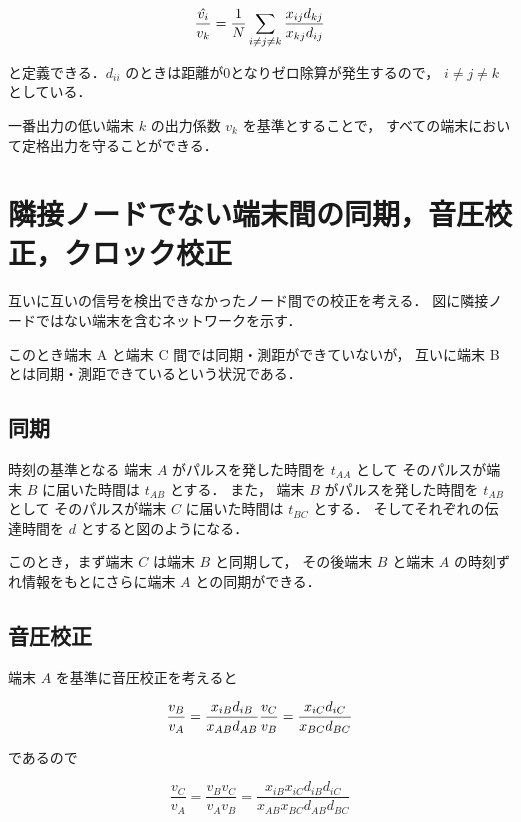 $$
\frac{\hat{v_i}}{v_k} = \frac{1}{N} \sum_{i\neq j \neq k} \frac{x_{ij} d_{kj}}{x_{kj}d_{ij}} \\
$$

と定義できる．$d_{ii}$ のときは距離が0となりゼロ除算が発生するので，
$i\neq j \neq k$ としている．

一番出力の低い端末 $k$ の出力係数 $v_k$ を基準とすることで，
すべての端末において定格出力を守ることができる．

\section{隣接ノードでない端末間の同期，音圧校正，クロック校正}


互いに互いの信号を検出できなかったノード間での校正を考える．
図に隣接ノードではない端末を含むネットワークを示す．


このとき端末 A と端末 C 間では同期・測距ができていないが，
互いに端末 B とは同期・測距できているという状況である．

\subsection{同期}

時刻の基準となる
端末 $A$ がパルスを発した時間を $t_{AA}$ として
そのパルスが端末 $B$ に届いた時間は $t_{AB}$ とする．
また，
端末 $B$ がパルスを発した時間を $t_{AB}$ として
そのパルスが端末 $C$ に届いた時間は $t_{BC}$ とする．
そしてそれぞれの伝達時間を $d$ とすると図のようになる．


このとき，まず端末 $C$ は端末 $B$ と同期して，
その後端末 $B$ と端末 $A$ の時刻ずれ情報をもとにさらに端末 $A$ との同期ができる．


\subsection{音圧校正}

端末 $A$ を基準に音圧校正を考えると

$$
\frac{v_B}{v_A} = \frac{x_{iB} d_{iB}}{x_{AB}d_{AB}} \\
\frac{v_C}{v_B} = \frac{x_{iC} d_{iC}}{x_{BC}d_{BC}} \\
$$

であるので

$$
\frac{v_C}{v_A} =
\frac{v_B v_C}{v_A v_B} =
\frac{x_{iB} x_{iC} d_{iB} d_{iC}}{x_{AB} x_{BC} d_{AB} d_{BC}}
$$

